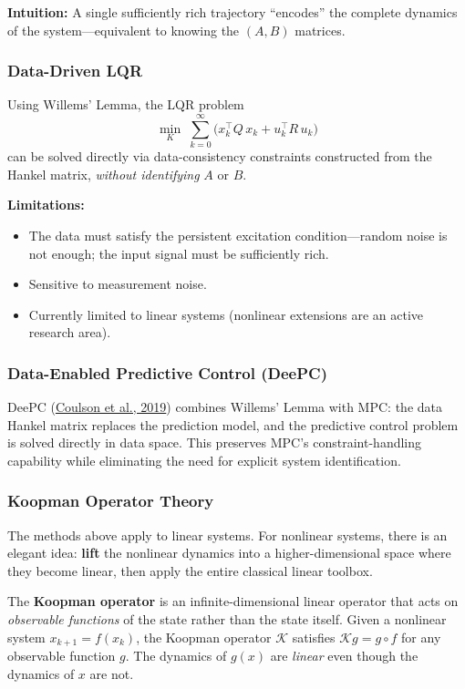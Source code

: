 \textbf{Intuition:} A single sufficiently rich trajectory ``encodes'' the complete dynamics of the system---equivalent to knowing the $(A, B)$ matrices.

\subsubsection{Data-Driven LQR}

Using Willems' Lemma, the LQR problem
\[
\min_{K}\; \sum_{k=0}^{\infty} \bigl(x_k^\top Q\, x_k + u_k^\top R\, u_k\bigr)
\]
can be solved directly via data-consistency constraints constructed from the Hankel matrix, \emph{without identifying} $A$ or $B$.

\textbf{Limitations:}
\begin{itemize}[nosep]
    \item The data must satisfy the persistent excitation condition---random noise is not enough; the input signal must be sufficiently rich.
    \item Sensitive to measurement noise.
    \item Currently limited to linear systems (nonlinear extensions are an active research area).
\end{itemize}

\subsubsection{Data-Enabled Predictive Control (DeePC)}

DeePC (\href{https://arxiv.org/abs/1811.05890}{Coulson et al., 2019}) combines Willems' Lemma with MPC: the data Hankel matrix replaces the prediction model, and the predictive control problem is solved directly in data space. This preserves MPC's constraint-handling capability while eliminating the need for explicit system identification.

\subsubsection{Koopman Operator Theory}

The methods above apply to linear systems. For nonlinear systems, there is an elegant idea: \textbf{lift} the nonlinear dynamics into a higher-dimensional space where they become linear, then apply the entire classical linear toolbox.

The \textbf{Koopman operator} is an infinite-dimensional linear operator that acts on \emph{observable functions} of the state rather than the state itself. Given a nonlinear system $x_{k+1} = f(x_k)$, the Koopman operator $\mathcal{K}$ satisfies $\mathcal{K} g = g \circ f$ for any observable function $g$. The dynamics of $g(x)$ are \emph{linear} even though the dynamics of $x$ are not.


